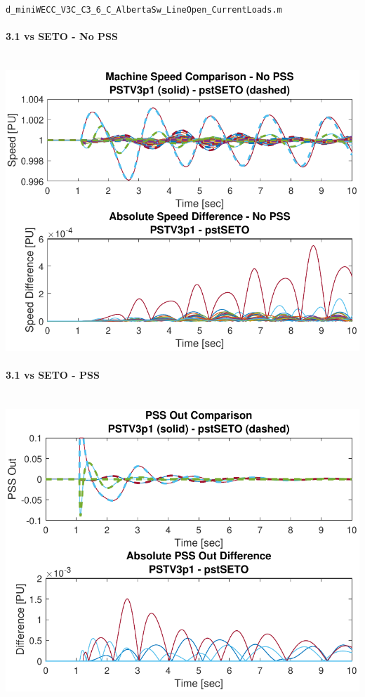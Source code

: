 \documentclass[12pt]{article}
\begin{document}
\raggedright
\begin{landscape}
\verb|d_miniWECC_V3C_C3_6_C_AlbertaSw_LineOpen_CurrentLoads.m|
\begin{multicols}{3}
\paragraph{3.1 vs SETO - No PSS} \ \\

\includegraphics[width=\linewidth]{seto3noPSS}

\paragraph{3.1 vs SETO - PSS} \ \\
\includegraphics[width=\linewidth]{seto3PSS}


\end{multicols}
\end{landscape}
\end{document}
